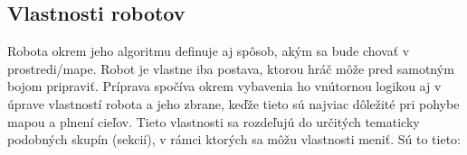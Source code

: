 \subsection{Vlastnosti robotov}
\indent Robota okrem jeho algoritmu definuje aj spôsob, akým sa bude chovať v prostredi/mape.
Robot je vlastne iba postava, ktorou hráč môže pred samotným bojom pripraviť. Príprava spočíva okrem vybavenia ho vnútornou logikou aj v úprave vlastností robota a jeho zbrane, keďže tieto sú najviac dôležité pri pohybe mapou a plnení cieľov. Tieto vlastnosti sa rozdeľujú do určitých tematicky podobných skupín (sekcií), v rámci ktorých sa môžu vlastnosti meniť. Sú to tieto:
